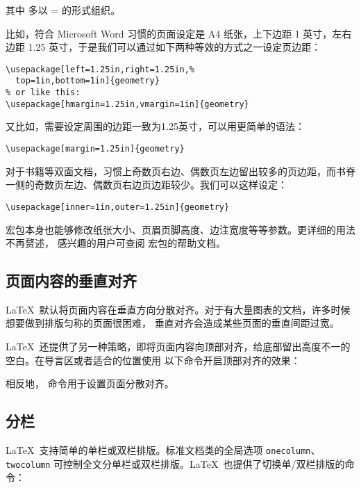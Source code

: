 其中  多以 = 的形式组织。

比如，符合 Microsoft Word 习惯的页面设定是 A4 纸张，上下边距 1 英寸，左右边距 1.25 英寸，于是我们可以通过如下两种等效的方式之一设定页边距：
\begin{verbatim}
\usepackage[left=1.25in,right=1.25in,%
  top=1in,bottom=1in]{geometry}
% or like this:
\usepackage[hmargin=1.25in,vmargin=1in]{geometry}
\end{verbatim}

又比如，需要设定周围的边距一致为1.25英寸，可以用更简单的语法：
\begin{verbatim}
\usepackage[margin=1.25in]{geometry}
\end{verbatim}

对于书籍等双面文档，习惯上奇数页右边、偶数页左边留出较多的页边距，而书脊一侧的奇数页左边、偶数页右边页边距较少。我们可以这样设定：
\begin{verbatim}
\usepackage[inner=1in,outer=1.25in]{geometry}
\end{verbatim}

 宏包本身也能够修改纸张大小、页眉页脚高度、边注宽度等等参数。更详细的用法不再赘述，
感兴趣的用户可查阅  宏包的帮助文档。

\subsection{页面内容的垂直对齐}\label{subsec:raggedbottom}

\LaTeX\ 默认将页面内容在垂直方向分散对齐。对于有大量图表的文档，许多时候想要做到排版匀称的页面很困难，
垂直对齐会造成某些页面的垂直间距过宽。

\LaTeX\ 还提供了另一种策略，即将页面内容向顶部对齐，给底部留出高度不一的空白。在导言区或者适合的位置使用
以下命令开启顶部对齐的效果：
\begin{command}
\end{command}

相反地， 命令用于设置页面分散对齐。

\subsection{分栏}\label{subsec:columns}

\LaTeX\ 支持简单的单栏或双栏排版。标准文档类的全局选项 \texttt{onecolumn}、\texttt{twocolumn} 
可控制全文分单栏或双栏排版。\LaTeX\ 也提供了切换单/双栏排版的命令：
\begin{command}
 \\
 \\
\end{command}


